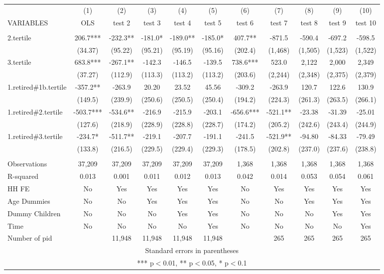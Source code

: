 \begin{tabular}{lcccccccccc} \hline
 & (1) & (2) & (3) & (4) & (5) & (6) & (7) & (8) & (9) & (10) \\
VARIABLES & OLS & test 2 & test 3 & test 4 & test 5 & test 6 & test 7 & test 8 & test 9 & test 10 \\ \hline
 &  &  &  &  &  &  &  &  &  &  \\
2.tertile & 206.7*** & -232.3** & -181.0* & -189.0** & -185.0* & 407.7** & -871.5 & -590.4 & -697.2 & -598.5 \\
 & (34.37) & (95.22) & (95.21) & (95.19) & (95.16) & (202.4) & (1,468) & (1,505) & (1,523) & (1,522) \\
3.tertile & 683.8*** & -267.1** & -142.3 & -146.5 & -139.5 & 738.6*** & 523.0 & 2,122 & 2,000 & 2,349 \\
 & (37.27) & (112.9) & (113.3) & (113.2) & (113.2) & (203.6) & (2,244) & (2,348) & (2,375) & (2,379) \\
1.retired\#1b.tertile & -357.2** & -263.9 & 20.20 & 23.52 & 45.56 & -309.2 & -263.9 & 120.7 & 122.6 & 130.9 \\
 & (149.5) & (239.9) & (250.6) & (250.5) & (250.4) & (194.2) & (224.3) & (261.3) & (263.5) & (266.1) \\
1.retired\#2.tertile & -503.7*** & -534.6** & -216.9 & -215.9 & -203.1 & -656.6*** & -521.1** & -23.38 & -31.39 & -25.01 \\
 & (127.6) & (218.9) & (228.9) & (228.8) & (228.7) & (174.2) & (205.2) & (242.6) & (243.4) & (244.9) \\
1.retired\#3.tertile & -234.7* & -511.7** & -219.1 & -207.7 & -191.1 & -241.5 & -521.9** & -94.80 & -84.33 & -79.49 \\
 & (133.8) & (216.5) & (229.5) & (229.4) & (229.3) & (178.5) & (202.8) & (237.0) & (237.6) & (238.8) \\
 &  &  &  &  &  &  &  &  &  &  \\
Observations & 37,209 & 37,209 & 37,209 & 37,209 & 37,209 & 1,368 & 1,368 & 1,368 & 1,368 & 1,368 \\
R-squared & 0.013 & 0.001 & 0.011 & 0.012 & 0.013 & 0.042 & 0.014 & 0.053 & 0.054 & 0.061 \\
HH FE & No & Yes & Yes & Yes & Yes & No & Yes & Yes & Yes & Yes \\
Age Dummies & No & No & Yes & Yes & Yes & No & No & Yes & Yes & Yes \\
Dummy Children & No & No & No & Yes & Yes & No & No & No & Yes & Yes \\
Time & No & No & No & No & Yes & No & No & No & No & Yes \\
 Number of pid &  & 11,948 & 11,948 & 11,948 & 11,948 &  & 265 & 265 & 265 & 265 \\ \hline
\multicolumn{11}{c}{ Standard errors in parentheses} \\
\multicolumn{11}{c}{ *** p$<$0.01, ** p$<$0.05, * p$<$0.1} \\
\end{tabular}
